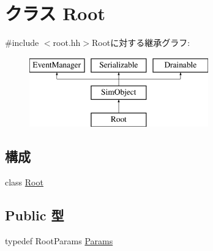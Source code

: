 \hypertarget{classRoot}{
\section{クラス Root}
\label{classRoot}
}


{\ttfamily \#include $<$root.hh$>$}Rootに対する継承グラフ:\begin{figure}[H]
\begin{center}
\leavevmode
\includegraphics[height=3cm]{classRoot}
\end{center}
\end{figure}
\subsection*{構成}
\begin{DoxyCompactItemize}
\item 
class \hyperlink{classRoot_1_1Root}{Root}
\end{DoxyCompactItemize}
\subsection*{Public 型}
\begin{DoxyCompactItemize}
\item 
typedef RootParams \hyperlink{classRoot_a0e87bb7e60cbe3229b1cb552ebb686e0}{Params}
\end{DoxyCompactItemize}
